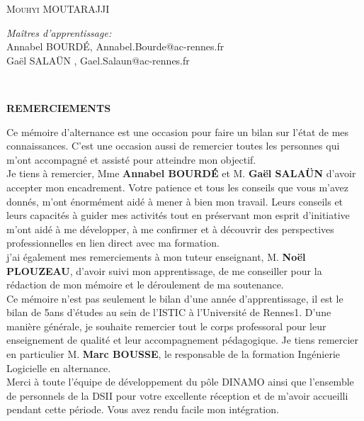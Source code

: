 \documentclass[12pt]{article}
\begin{document}
\begin{titlepage}
	\centering   %
	\textsc{ Mouhyi MOUTARAJJI}\\
		\begin{flushleft} \large
		    \emph{Maîtres d'apprentissage:} \\
		    Annabel BOURDÉ, Annabel.Bourde@ac-rennes.fr\\
			Gaël SALAÜN , Gael.Salaun@ac-rennes.fr\\
			
			
		\end{flushleft}
	
\end{titlepage}


\newpage

\tableofcontents
~
\newpage
\begin{center}
\bfseries {REMERCIEMENTS}
\end{center}


Ce mémoire d'alternance est  une occasion pour faire un bilan sur l'état de mes connaissances. C'est une occasion aussi de remercier toutes les personnes qui m'ont accompagné et assisté pour atteindre mon objectif.\\


Je tiens à remercier, Mme \textbf{Annabel BOURDÉ} et M. \textbf{Gaël SALAÜN} d'avoir accepter mon encadrement. Votre patience et tous les conseils que vous m'avez donnés, m'ont énormément aidé à mener à bien mon travail. Leurs conseils et leurs capacités à guider mes activités tout en préservant mon esprit d'initiative m'ont aidé à me développer, à me confirmer et à découvrir des perspectives professionnelles en lien direct avec ma formation.\\ 


j'ai également mes remerciements à mon tuteur enseignant, M. \textbf{Noël PLOUZEAU},  d'avoir suivi mon apprentissage, de me conseiller pour la rédaction de mon mémoire et le déroulement de ma soutenance. \\

Ce mémoire n'est pas seulement le bilan d'une année d'apprentissage, il est le bilan de 5ans d'études au sein de l'ISTIC à l'Université de Rennes1. D'une manière générale, je souhaite remercier tout le corps professoral pour leur enseignement de qualité et leur accompagnement pédagogique. Je tiens remercier en particulier M. \textbf{Marc BOUSSE}, le responsable de la formation Ingénierie Logicielle en alternance. \\

Merci à toute l'équipe de développement du pôle DINAMO ainsi que l'ensemble de personnels de la DSII pour votre excellente réception et de m'avoir accueilli pendant cette période. Vous avez rendu facile mon intégration. \\
\end{document}
